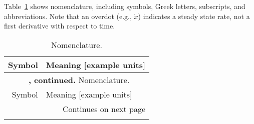 
Table~\ref{tab:long_nomenclature} shows nomenclature, 
including symbols, Greek letters, subscripts, and abbreviations.
Note that an overdot (e.g., $\dot{x}$) indicates a steady state rate,
not a first derivative with respect to time.

\begin{center}
\begin{longtable}{r l}
\caption{Nomenclature.} \label{tab:long_nomenclature} \\

\toprule 
Symbol & Meaning [example units] \\ 
\midrule 
\endfirsthead

\multicolumn{2}{c}{\small {\bfseries \tablename\ \thetable{}, continued.} Nomenclature.} \\
\toprule 
Symbol & Meaning [example units] \\ 
\midrule 
\endhead

\bottomrule
\multicolumn{2}{r}{Continues on next page} \\ 
\endfoot

\bottomrule
\endlastfoot


\end{longtable}
\end{center}
